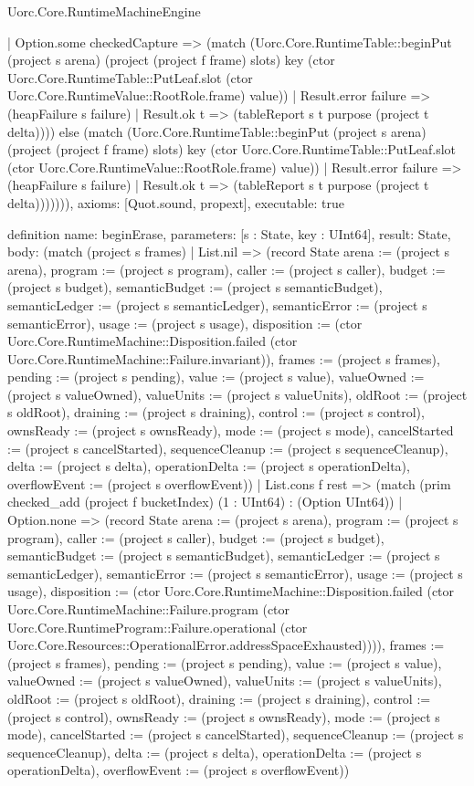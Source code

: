 \begin{lexlean}{Uorc.Core.RuntimeMachineEngine}
\begin{semanticmodule}
{        | Option.some checkedCapture => (match (Uorc.Core.RuntimeTable::beginPut (project s arena) (project (project f frame) slots) key (ctor Uorc.Core.RuntimeTable::PutLeaf.slot (ctor Uorc.Core.RuntimeValue::RootRole.frame) value))
          | Result.error failure => (heapFailure s failure)
          | Result.ok t => (tableReport s t purpose (project t delta)))) else (match (Uorc.Core.RuntimeTable::beginPut (project s arena) (project (project f frame) slots) key (ctor Uorc.Core.RuntimeTable::PutLeaf.slot (ctor Uorc.Core.RuntimeValue::RootRole.frame) value))
        | Result.error failure => (heapFailure s failure)
        | Result.ok t => (tableReport s t purpose (project t delta))))))),
  axioms: [Quot.sound, propext],
  executable: true
}

definition{
  name: beginErase,
  parameters: [s : State, key : UInt64],
  result: State,
  body: (match (project s frames)
    | List.nil => (record State {arena := (project s arena), program := (project s program), caller := (project s caller), budget := (project s budget), semanticBudget := (project s semanticBudget), semanticLedger := (project s semanticLedger), semanticError := (project s semanticError), usage := (project s usage), disposition := (ctor Uorc.Core.RuntimeMachine::Disposition.failed (ctor Uorc.Core.RuntimeMachine::Failure.invariant)), frames := (project s frames), pending := (project s pending), value := (project s value), valueOwned := (project s valueOwned), valueUnits := (project s valueUnits), oldRoot := (project s oldRoot), draining := (project s draining), control := (project s control), ownsReady := (project s ownsReady), mode := (project s mode), cancelStarted := (project s cancelStarted), sequenceCleanup := (project s sequenceCleanup), delta := (project s delta), operationDelta := (project s operationDelta), overflowEvent := (project s overflowEvent)})
    | List.cons f rest => (match (prim checked_add (project f bucketIndex) (1 : UInt64) : (Option UInt64))
      | Option.none => (record State {arena := (project s arena), program := (project s program), caller := (project s caller), budget := (project s budget), semanticBudget := (project s semanticBudget), semanticLedger := (project s semanticLedger), semanticError := (project s semanticError), usage := (project s usage), disposition := (ctor Uorc.Core.RuntimeMachine::Disposition.failed (ctor Uorc.Core.RuntimeMachine::Failure.program (ctor Uorc.Core.RuntimeProgram::Failure.operational (ctor Uorc.Core.Resources::OperationalError.addressSpaceExhausted)))), frames := (project s frames), pending := (project s pending), value := (project s value), valueOwned := (project s valueOwned), valueUnits := (project s valueUnits), oldRoot := (project s oldRoot), draining := (project s draining), control := (project s control), ownsReady := (project s ownsReady), mode := (project s mode), cancelStarted := (project s cancelStarted), sequenceCleanup := (project s sequenceCleanup), delta := (project s delta), operationDelta := (project s operationDelta), overflowEvent := (project s overflowEvent)})
}
\end{semanticmodule}
\end{lexlean}
